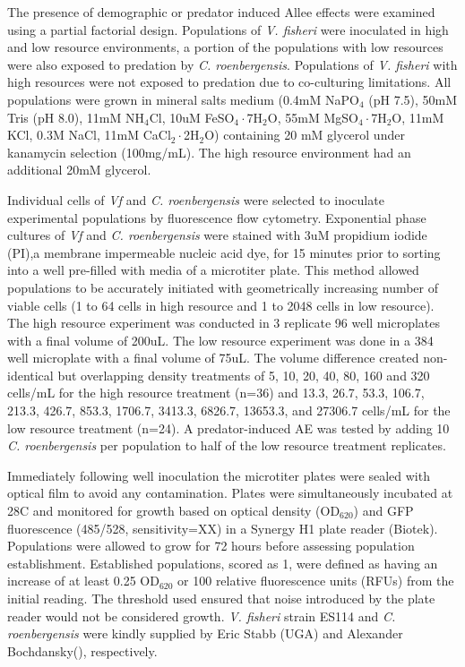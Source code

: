 \documentclass[a4paper,10pt]{article}\usepackage[]{graphicx}\usepackage[]{color}
\begin{document}
The presence of demographic or predator induced Allee effects were examined using a partial factorial design. Populations of \textit{V. fisheri} were inoculated in high and low resource environments, a portion of the populations with low resources were also exposed to predation by \textit{C. roenbergensis}. Populations of \textit{V. fisheri} with high resources were not exposed to predation due to co-culturing limitations. All populations were grown in mineral salts medium (0.4mM NaPO$_{4}$ (pH 7.5), 50mM Tris (pH 8.0), 11mM NH$_{4}$Cl, 10uM  FeSO$_{4}\cdot$7H$_{2}$O, 55mM MgSO$_{4}\cdot$7H$_{2}$O, 11mM KCl, 0.3M NaCl, 11mM CaCl$_{2}\cdot$2H$_{2}$O) containing 20 mM glycerol under kanamycin selection (100mg/mL). The high resource environment had an additional 20mM glycerol. 

Individual cells of \textit{Vf} and \textit{C. roenbergensis} were selected to inoculate experimental populations by fluorescence flow cytometry. Exponential phase cultures of \textit{Vf} and \textit{C. roenbergensis} were stained with 3uM propidium iodide (PI),a membrane impermeable nucleic acid dye, for 15 minutes prior to sorting into a well pre-filled with media of a microtiter plate. This method allowed populations to be accurately initiated with geometrically increasing number of viable cells (1 to 64 cells in high resource and 1 to 2048 cells in low resource). The high resource experiment was conducted in 3 replicate 96 well microplates with a final volume of 200uL. The low resource experiment was done in a 384 well microplate with a final volume of 75uL. The volume difference created non-identical but overlapping density treatments of 5, 10, 20, 40, 80, 160 and 320 cells/mL for the high resource treatment (n=36) and  13.3, 26.7, 53.3, 106.7, 213.3, 426.7, 853.3, 1706.7, 3413.3, 6826.7, 13653.3, and 27306.7 cells/mL for the low resource treatment (n=24). A predator-induced AE was tested by adding 10 \textit{C. roenbergensis} per population to half of the low resource treatment replicates.  

Immediately following well inoculation the microtiter plates were sealed with optical film to avoid any contamination. Plates were simultaneously incubated at 28C and monitored for growth based on optical density (OD$_{620}$) and GFP fluorescence (485/528, sensitivity=XX) in a Synergy H1 plate reader (Biotek). Populations were allowed to grow for 72 hours before assessing population establishment. Established populations, scored as 1, were defined as having an increase of at least 0.25 OD$_{620}$ or 100 relative fluorescence units (RFUs) from the initial reading. The threshold used ensured that noise introduced by the plate reader would not be considered growth. \textit{V. fisheri} strain ES114  and \textit{C. roenbergensis} were kindly supplied by Eric Stabb (UGA) and Alexander Bochdansky(), respectively.  
  
\end{document}
